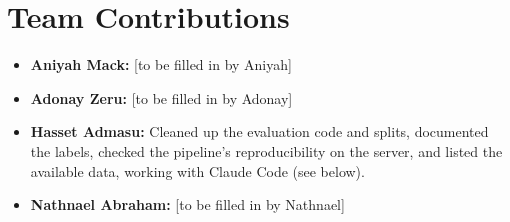 \documentclass[11pt]{article}
\begin{document}
\section*{Team Contributions}
\begin{itemize}[noitemsep]
  \item \textbf{Aniyah Mack:} [to be filled in by Aniyah]
  \item \textbf{Adonay Zeru:} [to be filled in by Adonay]
  \item \textbf{Hasset Admasu:} Cleaned up the evaluation code and splits, documented the labels, checked
        the pipeline's reproducibility on the server, and listed the available data, working with Claude
        Code (see below).
  \item \textbf{Nathnael Abraham:} [to be filled in by Nathnael]
\end{itemize}
\end{document}
